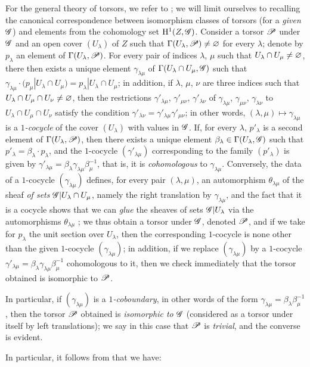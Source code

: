 \begin{env}[16.5.15]
For the general theory of torsors, we refer to \cite{IV-42};
we will limit ourselves to recalling the canonical correspondence between isomorphism classes of torsors (for a \emph{given} $\mathscr{G}$) and elements from the cohomology set $\mathrm{H}^1(Z, \mathscr{G})$.
Consider a torsor $\mathscr{P}$ under $\mathscr{G}$ and an open cover $(U_\lambda)$ of $Z$ such that $\Gamma(U_\lambda, \mathscr{P}) \neq \varnothing$ for every $\lambda$;
denote by $p_\lambda$ an element of $\Gamma(U_\lambda, \mathscr{P})$.
For every pair of indices $\lambda$, $\mu$ such that $U_\lambda \cap U_\mu \neq \varnothing$, there then exists a unique element $\gamma_{\lambda\mu}$ of $\Gamma(U_\lambda \cap U_\mu, \mathscr{G})$ such that $\gamma_{\lambda\mu} \cdot (p_\mu|U_\lambda \cap U_\mu) = p_\lambda|U_\lambda \cap U_\mu$;
in addition, if $\lambda$, $\mu$, $\nu$ are three indices such that $U_\lambda \cap U_\mu \cap U_\nu \neq \varnothing$, then the restrictions $\gamma'_{\lambda\mu}$, $\gamma'_{\mu\nu}$, $\gamma'_{\lambda\nu}$ of $\gamma_{\lambda\mu}$, $\gamma_{\mu\nu}$, $\gamma_{\lambda\nu}$ to $U_\lambda \cap U_\mu \cap U_\nu$ satisfy the condition $\gamma'_{\lambda\nu} = \gamma'_{\lambda\mu} \gamma'_{\mu\nu}$;
in other words, $(\lambda, \mu) \mapsto \gamma_{\lambda\mu}$ is a \emph{$1$-cocycle} of the cover $(U_\lambda)$ with values in $\mathscr{G}$.
If, for every $\lambda$, $p'_\lambda$ is a second element of $\Gamma(U_\lambda, \mathscr{P})$, then there exists a unique element $\beta_\lambda \in \Gamma(U_\lambda, \mathscr{G})$ such that $p'_\lambda = \beta_\lambda \cdot p_\lambda$, and the $1$-cocycle $(\gamma'_{\lambda\mu})$ corresponding to the family $(p'_\lambda)$ is given by $\gamma'_{\lambda\mu} = \beta_\lambda \gamma_{\lambda\mu} \beta_\mu^{-1}$, that is, it is \emph{cohomologous} to $\gamma_{\lambda\mu}$.
Conversely, the data of a $1$-cocycle $(\gamma_{\lambda\mu})$ defines, for every pair $(\lambda, \mu)$, an automorphism $\theta_{\lambda\mu}$ of the sheaf \emph{of sets} $\mathscr{G}|U_\lambda \cap U_\mu$, namely the right translation by $\gamma_{\lambda\mu}$, and the fact that it is a cocycle shows that we can \emph{glue} the sheaves of sets $\mathscr{G}|U_\lambda$ via the automorphisms $\theta_{\lambda\mu}$ ;
we thus obtain a torsor under $\mathscr{G}$, denoted $\mathscr{P}$, and if we take for $p_\lambda$ the unit section over $U_\lambda$, then the corresponding $1$-cocycle is none other than the given $1$-cocycle $(\gamma_{\lambda\mu})$;
in addition, if we replace $(\gamma_{\lambda\mu})$ by a $1$-cocycle $\gamma'_{\lambda\mu} = \beta_\lambda \gamma_{\lambda\mu} \beta_\mu^{-1}$ cohomologous to it, then we check immediately that the torsor obtained is isomorphic to $\mathscr{P}$.

In particular, if $(\gamma_{\lambda\mu})$ is a \emph{$1$-coboundary}, in other words of the form $\gamma_{\lambda\mu} = \beta_\lambda \beta_\mu^{-1}$, then the torsor $\mathscr{P}$ obtained is \emph{isomorphic to $\mathscr{G}$} (considered as a torsor under itself by left translations);
we say in this case that $\mathscr{P}$ is \emph{trivial}, and the converse is evident.

In particular, it follows from  that we have:
\end{env}

